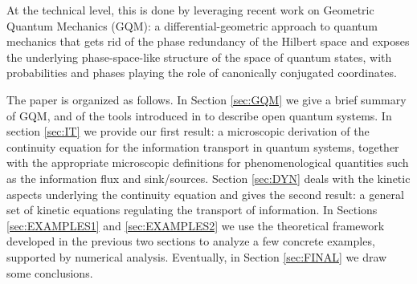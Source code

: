 \documentclass[draft,nofootinbib,pre,twocolumn,showpacs,showkeys,preprintnumbers,floatfix]{revtex4-1}
\newcommand{\1}{\mathbbm{1}}
\begin{document}
At the technical level, this is done by leveraging recent work \cite{Anza20a,Anza20b,Anza20c} on 
Geometric Quantum Mechanics (GQM): a differential-geometric approach to quantum mechanics that 
gets rid of the phase redundancy of the Hilbert space and exposes the underlying phase-space-like
structure of the space of quantum states, with probabilities and phases playing the role of 
canonically conjugated coordinates.

The paper is organized as follows. In Section \ref{sec:GQM} we give a brief summary of 
GQM, and of the tools introduced in \cite{Anza20a,Anza20b} to describe open quantum systems. 
In section \ref{sec:IT} we provide our first result: a microscopic derivation of the continuity equation 
for the information transport in quantum systems, together with the appropriate microscopic definitions 
for phenomenological quantities such as the information flux and sink/sources. Section \ref{sec:DYN} 
deals with the kinetic aspects underlying the continuity equation and gives the second result: a general 
set of kinetic equations regulating the transport of information. In Sections \ref{sec:EXAMPLES1} and \ref{sec:EXAMPLES2} 
we use the theoretical framework developed in the previous two sections to analyze a few concrete examples, 
supported by numerical analysis. Eventually, in Section \ref{sec:FINAL} we draw some conclusions. 




\end{document}
